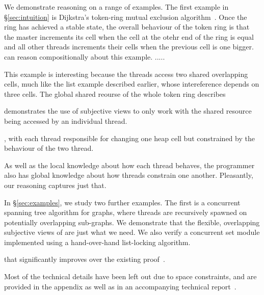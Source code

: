 We demonstrate 
\colosl reasoning on a range of
examples.  The first example in \S\ref{sec:intuition} is 
 Dijkstra's token-ring mutual exclusion
algorithm~\cite{dijkstra74}. Once the ring has achieved a stable
state, the overall  behaviour of the token
ring is that the master increments its cell when the cell at the otehr
end of the ring is  equal
and all other threads increments their  cells when the 
previous cell is one bigger. \colosl can reason compositionally about
this example. 
.....



This example is interesting because the
threads access two shared overlapping cells, much like the list example described
earlier, whose intereference depends on three cells. The global shared reourse of the whole token ring describes 



demonstrates the use of
subjective views to only work with the shared resource being accessed
by an individual thread. 


, with each
thread responsible for changing one heap cell but constrained by the
behaviour of the two thread. 


As well as the local knowledge about how
each thread behaves, the programmer also has global knowledge about
how threads constrain one another. Pleasantly, our reasoning captures
just that. 


In \S\ref{sec:examples}, we study two further examples. The first is a concurrent spanning tree
algorithm for graphs, where threads are recursively spawned on 
potentially overlapping sub-graphs. We demonstrate that the flexible,
overlapping subjective views of \colosl are just what we need.  We
also verify a concurrent set module implemented using a hand-over-hand
list-locking algorithm.



 that significantly improves over the existing
proof~\cite{cap-ecoop10}.

Most of the technical details have been left out due to space
constraints, and are provided in the appendix as well as in an
accompanying technical report~\cite{colosl-tr14}.

